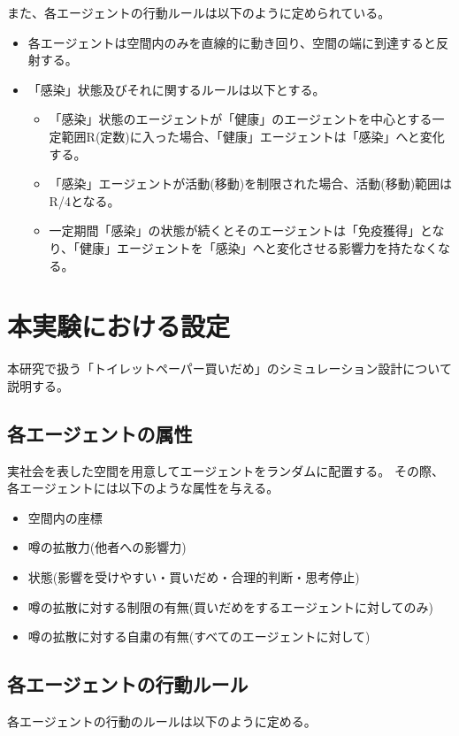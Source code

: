 また、各エージェントの行動ルールは以下のように定められている。

\begin{itemize}
  \item 各エージェントは空間内のみを直線的に動き回り、空間の端に到達すると反射する。
  \item 「感染」状態及びそれに関するルールは以下とする。
  \begin{itemize}
    \item 「感染」状態のエージェントが「健康」のエージェントを中心とする一定範囲R(定数)に入った場合、「健康」エージェントは「感染」へと変化する。
    \item 「感染」エージェントが活動(移動)を制限された場合、活動(移動)範囲はR/4となる。
    \item 一定期間「感染」の状態が続くとそのエージェントは「免疫獲得」となり、「健康」エージェントを「感染」へと変化させる影響力を持たなくなる。
  \end{itemize}  
\end{itemize}

\section{本実験における設定}
本研究で扱う「トイレットペーパー買いだめ」のシミュレーション設計について説明する。

\subsection{各エージェントの属性}
実社会を表した空間を用意してエージェントをランダムに配置する。
その際、各エージェントには以下のような属性を与える。

\begin{itemize}
  \item 空間内の座標
  \item 噂の拡散力(他者への影響力)
  \item 状態(影響を受けやすい・買いだめ・合理的判断・思考停止)
  \item 噂の拡散に対する制限の有無(買いだめをするエージェントに対してのみ)
  \item 噂の拡散に対する自粛の有無(すべてのエージェントに対して)

\end{itemize}

\subsection{各エージェントの行動ルール}
各エージェントの行動のルールは以下のように定める。

